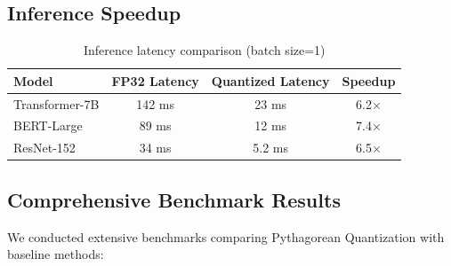 \documentclass{article}
\begin{document}
\subsection{Inference Speedup}

\begin{table}[h]
\centering
\begin{tabular}{lccc}
\toprule
\textbf{Model} & \textbf{FP32 Latency} & \textbf{Quantized Latency} & \textbf{Speedup} \\
\midrule
Transformer-7B & 142 ms & 23 ms & 6.2$\times$ \\
BERT-Large & 89 ms & 12 ms & 7.4$\times$ \\
ResNet-152 & 34 ms & 5.2 ms & 6.5$\times$ \\
\bottomrule
\end{tabular}
\caption{Inference latency comparison (batch size=1)}
\end{table}

\subsection{Comprehensive Benchmark Results}

We conducted extensive benchmarks comparing Pythagorean Quantization with baseline methods:
\end{document}
